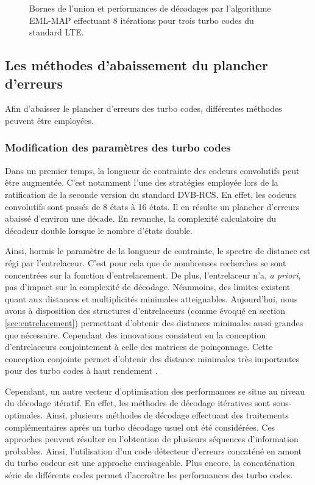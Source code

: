 
\begin{figure}[h!]
	\centering
	
	\label{fig:ubound}
	\caption{Bornes de l'union et performances de décodages par l'algorithme EML-MAP effectuant 8 itérations pour trois 
	turbo codes du standard LTE.}
\end{figure}
		
\subsection{Les méthodes d'abaissement du plancher d'erreurs}
Afin d'abaisser le plancher d'erreurs des turbo codes, différentes méthodes peuvent être employées. 
\subsubsection{Modification des paramètres des turbo codes}
Dans un premier temps, la longueur de contrainte des codeurs convolutifs peut être augmentée. C'est notamment l'une des 
stratégies employée lors de la ratification de la seconde version du standard DVB-RCS. En effet, les codeurs convolutifs 
sont passés de 8 états à 16 états. Il en résulte un plancher d'erreurs abaissé d'environ une décade. En revanche, la 
complexité calculatoire du décodeur double lorsque le nombre d'états double.
		
Ainsi, hormis le paramètre de la longueur de contrainte, le spectre de distance est régi par l'entrelaceur. C'est pour 
cela que de nombreuses recherches se sont concentrées sur la fonction d'entrelacement. De plus, l'entrelaceur n'a, 
\textit{a priori}, pas d'impact sur la complexité de décodage. Néanmoins, des limites existent quant aux distances et 
multiplicités minimales atteignables. Aujourd'hui, nous avons à disposition des structures d'entrelaceurs (comme évoqué 
en section \ref{sec:entrelacement}) permettant d'obtenir des distances minimales aussi grandes que nécessaire. Cependant 
des innovations consistent en la conception d'entrelaceurs conjointement à celle des matrices de poinçonnage. Cette 
conception conjointe permet d'obtenir des distance minimales très importantes pour des turbo codes à haut rendement 
\cite{punctureConstrained}.

Cependant, un autre vecteur d'optimisation des performances se situe au niveau du décodage itératif. En effet, les 
méthodes de décodage itératives sont sous-optimales. Ainsi, plusieurs méthodes de décodage effectuant des traitements 
complémentaires après un turbo décodage usuel ont été considérées. Ces approches peuvent résulter en l'obtention de 
plusieurs séquences d'information probables. Ainsi, l'utilisation d'un code détecteur d'erreurs concaténé en amont du 
turbo codeur est une approche envisageable. Plus encore, la concaténation série de différents codes permet d’accroître 
les performances des turbo codes. 

